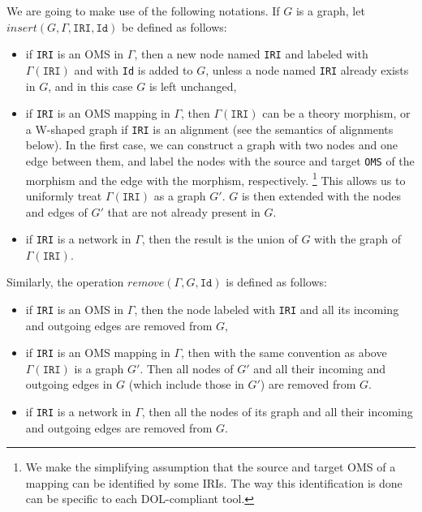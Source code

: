 \documentclass[10pt,fleqn,%
\ifpretendfinal
final%
\else
draft%
\fi,
]{scrreprt}
\newcommand*{\syntax}[1]{\texttt{#1}}
\begin{document}
We are going to make use of the following notations. If $G$ is a graph, let $insert(G, \Gamma, \syntax{IRI}, \syntax{Id})$ be defined as follows:
 \begin{itemize}
    \item if \syntax{IRI} is an OMS in $\Gamma$, then
                 a new node named \syntax{IRI} and labeled with $\Gamma(\syntax{IRI})$ and with \syntax{Id} is added to $G$,
                 unless a node named \syntax{IRI} already exists in $G$, and in this case $G$ is left unchanged,
   \item if \syntax{IRI} is an OMS mapping in $\Gamma$, then $\Gamma(\syntax{IRI})$ can be a theory morphism, or a W-shaped
               graph if \syntax{IRI} is an alignment (see the semantics of alignments below).  In the first case, we can construct a graph
               with two nodes and one edge between them, and label the nodes with the source and target \syntax{OMS} of the morphism
                and the edge with the morphism, respectively.
               \footnote{We make the simplifying assumption that the source and target OMS of a mapping can be identified by some IRIs. The
                 way this identification is done can be specific to each DOL-compliant tool.} 
                 This allows us to uniformly treat $\Gamma(\syntax{IRI})$ as a graph $G'$.
                 $G$ is then extended with the nodes and edges of $G'$ that are not already present in $G$.               
   \item if \syntax{IRI} is a network in $\Gamma$, then the result is the union of $G$ with the graph of $\Gamma(\syntax{IRI})$.
 \end{itemize}
Similarly, the operation $remove(\Gamma, G, \syntax{Id})$ is defined as follows:
 \begin{itemize}
    \item if \syntax{IRI} is an OMS in $\Gamma$, then the node labeled with \syntax{IRI} and all its incoming and outgoing
                edges are removed from $G$,
   \item  if \syntax{IRI} is an OMS mapping in $\Gamma$, then with the same convention as above $\Gamma(\syntax{IRI})$ is a graph $G'$.
                Then all nodes of $G'$ and all their incoming and outgoing edges in $G$ (which include those in $G'$) are removed from $G$.
   \item if \syntax{IRI} is a network in $\Gamma$, then all the nodes of its graph and all their incoming and outgoing edges are removed 
               from $G$.
 \end{itemize}
\end{document}
